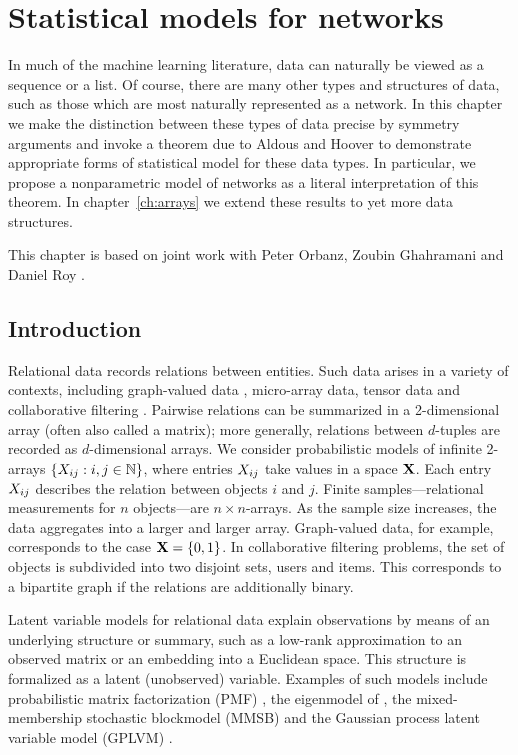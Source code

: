 
\inbpdocument

\chapter{Statistical models for networks}
\label{ch:networks}

In much of the machine learning literature, data can naturally be viewed as a sequence or a list.
Of course, there are many other types and structures of data, such as those which are most naturally represented as a network.
In this chapter we make the distinction between these types of data precise by symmetry arguments and invoke a theorem due to Aldous and Hoover to demonstrate appropriate forms of statistical model for these data types.
In particular, we propose a nonparametric model of networks as a literal interpretation of this theorem.
In chapter~\ref{ch:arrays} we extend these results to yet more data structures.

This chapter is based on joint work with Peter Orbanz, Zoubin Ghahramani and Daniel Roy \citep{Lloyd2012-sb}.

\section{Introduction}

Relational data records relations between entities.
Such data arises in a variety of contexts, including graph-valued data \citep[e.g.][]{Airoldi2008-fr,Hoff2002-vy}, micro-array data, tensor data \citep[e.g.][]{Xu2012-ub} and collaborative filtering \citep[e.g.][]{Salakhutdinov2008-tp}.
Pairwise relations can be summarized in a 2-dimensional array (often also called a matrix);
more generally, relations between $d$-tuples are recorded as $d$-dimensional arrays.
We consider probabilistic models of infinite 2-arrays $\{X_{ij} : i,j\in\mathbb{N}\}$, where entries $X_{ij}$ take values in a space $\mathbf{X}$. 
Each entry $X_{ij}$ describes the relation between objects $i$ and $j$. Finite
samples---relational measurements for $n$ objects---are $n\times n$-arrays. As the sample size increases, the data aggregates into
a larger and larger array. 
Graph-valued data, for example, corresponds to the case $\mathbf{X}=\lbrace{0,1}\rbrace$.
In collaborative filtering problems, the set of objects is subdivided into two disjoint sets, \eg users and items.
This corresponds to a bipartite graph if the relations are additionally binary.

Latent variable models for relational data explain observations by means of an underlying structure
or summary,
such as a low-rank approximation to an observed matrix or an embedding into a Euclidean space.
This structure is formalized as a latent (unobserved) variable.
Examples of such models include probabilistic matrix factorization (PMF) \citep{Salakhutdinov2008-tp}, the eigenmodel of 
\citet{Hoff2007-ja}, the mixed-membership stochastic blockmodel (MMSB) \citep{Airoldi2008-fr}
and the Gaussian process latent variable model (GPLVM) \citep[e.g.][]{Lawrence2009-za}.

